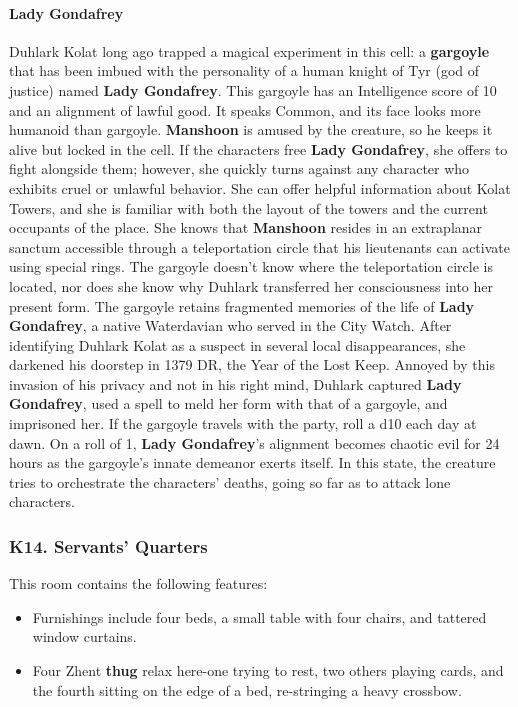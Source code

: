 \documentclass[10pt,a4paper,twoside,twocolumn,openany,nodeprecatedcode]{dndbook}
\begin{document}
\paragraph{Lady Gondafrey}
Duhlark Kolat long ago trapped a magical experiment in this cell: a \textbf{gargoyle} that has been imbued with the personality of a human knight of Tyr (god of justice) named \textbf{Lady Gondafrey}. This gargoyle has an Intelligence score of 10 and an alignment of lawful good. It speaks Common, and its face looks more humanoid than gargoyle. \textbf{Manshoon} is amused by the creature, so he keeps it alive but locked in the cell.
If the characters free \textbf{Lady Gondafrey}, she offers to fight alongside them; however, she quickly turns against any character who exhibits cruel or unlawful behavior. She can offer helpful information about Kolat Towers, and she is familiar with both the layout of the towers and the current occupants of the place. She knows that \textbf{Manshoon} resides in an extraplanar sanctum accessible through a teleportation circle that his lieutenants can activate using special rings. The gargoyle doesn't know where the teleportation circle is located, nor does she know why Duhlark transferred her consciousness into her present form.
The gargoyle retains fragmented memories of the life of \textbf{Lady Gondafrey}, a native Waterdavian who served in the City Watch. After identifying Duhlark Kolat as a suspect in several local disappearances, she darkened his doorstep in 1379 DR, the Year of the Lost Keep. Annoyed by this invasion of his privacy and not in his right mind, Duhlark captured \textbf{Lady Gondafrey}, used a spell to meld her form with that of a gargoyle, and imprisoned her.
If the gargoyle travels with the party, roll a d10 each day at dawn. On a roll of 1, \textbf{Lady Gondafrey}'s alignment becomes chaotic evil for 24 hours as the gargoyle's innate demeanor exerts itself. In this state, the creature tries to orchestrate the characters' deaths, going so far as to attack lone characters.
\subsubsection{K14. Servants' Quarters}
This room contains the following features:
\begin{itemize}

\item Furnishings include four beds, a small table with four chairs, and tattered window curtains.
\item Four Zhent \textbf{thug} relax here-one trying to rest, two others playing cards, and the fourth sitting on the edge of a bed, re-stringing a heavy crossbow.
\end{itemize}
\end{document}
